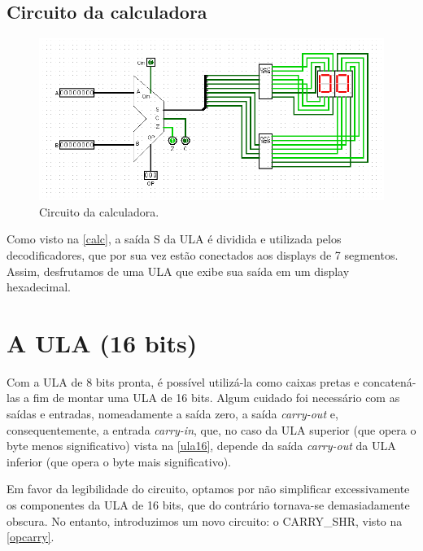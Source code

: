 \documentclass[
	12pt,				%
	openright,			%
	twoside,			%
	a4paper,			%
	english,			%
	french,				%
	spanish,			%
	brazil,				%
	]{abntex2}
\begin{document}
\section{Circuito da calculadora}
\begin{figure}[H]
	\begin{center}
	    \includegraphics[scale=0.57]{calc.png}
	\end{center}
\caption{\label{calc}Circuito da calculadora.}
\end{figure}

Como visto na \autoref{calc}, a saída S da ULA é dividida e utilizada pelos decodificadores, que por sua vez estão conectados aos displays de 7 segmentos. Assim, desfrutamos de uma ULA que exibe sua saída em um display hexadecimal.


\chapter{A ULA (16 bits)}

Com a ULA de 8 bits pronta, é possível utilizá-la como caixas pretas e concatená-las a fim de montar uma ULA de 16 bits. Algum cuidado foi necessário com as saídas e entradas, nomeadamente a saída zero, a saída \textit{carry-out} e, consequentemente, a entrada \textit{carry-in}, que, no caso da ULA superior (que opera o byte menos significativo) vista na \autoref{ula16}, depende da saída \textit{carry-out} da ULA inferior (que opera o byte mais significativo).

Em favor da legibilidade do circuito, optamos por não simplificar excessivamente os componentes da ULA de 16 bits, que do contrário tornava-se demasiadamente obscura. No entanto, introduzimos um novo circuito: o CARRY\_SHR, visto na \autoref{opcarry}.
\end{document}
